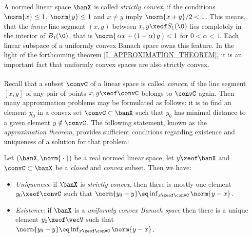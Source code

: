 \documentclass[11pt,twoside]{article}
\begin{document}
\subparagraph{} %
A normed linear space $\banX$ is called \textit{strictly convex},
if the conditions
$\norm{x} \leq 1$, $\norm{y} \leq 1$ and $x \neq y$
imply
$\norm{x+y}/2< 1$.
This means,
that the \textit{inner} line segment $(x,y)$
between $x,y \xeof S_1(\0)$ lies completely in the interior of $B_1(\0)$,
that is
$\norm{\,\alpha x + (1-\alpha)\,y\,} < 1$ for $0 < \alpha < 1$.
Each linear subspace of a uniformly convex Banach space owns this feature.
In the light of the forthcoming theorem \ref{I_APPROXIMATION_THEOREM},
it is an important fact
that uniformly convex spaces are also strictly convex.

\paragraph{} %
Recall that a subset $\convC$ of a linear space is called \textit{convex},
if the line segment $[x,y]$ of any pair of points $x,y \xeof \convC$
belongs to $\convC$ again.
Then many approximation problems may be formulated as follows:
it is to find an element $y_0$ in a convex set $\convC \subset \banX$
such that $y_0$ has minimal distance to a given element $y \notin \convC$.
The following statement,
known as the \textit{approximation theorem},
provides sufficient conditions regarding existence and uniqueness
of a solution for that problem:

\begin{theorem1}\label{I_APPROXIMATION_THEOREM}
Let $(\banX,\norm{\,\cdot\,})$ be a real normed linear space,
let $y \xeof \banX$ and
$\convC \subset \banX$ be a \textit{closed} and \textit{convex} subset.
Then we have:

\begin{itemize}[leftmargin=17pt,itemsep=5pt]
\item[(a)] \textit{Uniqueness}:
if $\banX$ is \textit{strictly convex},
then there is mostly one element $y_0 \xeof \convC$
such that $\norm{y_0-y} \eq \inf_{x \xeof \convC} \norm{y-x}$.

\item[(b)] \textit{Existence}:
if $\banX$ is a \textit{uniformly convex Banach space}
then there is a unique element $y_0 \xeof \vecV$
such that $\norm{y_0-y} \eq \inf_{x \xeof \convC} \norm{y-x}$.
\end{itemize}
\end{theorem1}
\end{document}
